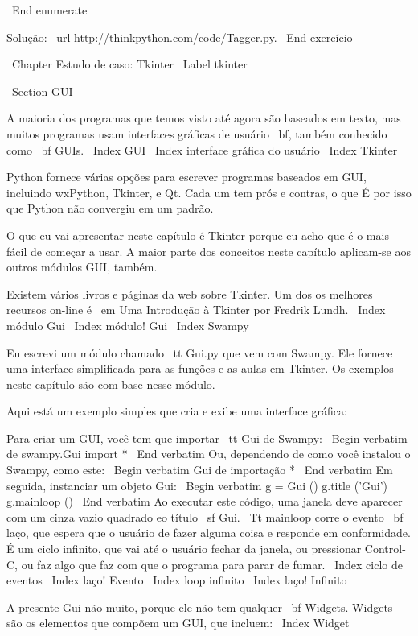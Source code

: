 \documentclass[10pt]{book}
\begin{document}
{{{{{{{{{{{{{{{{{{{\ End {enumerate}

Solução: \ url {http://thinkpython.com/code/Tagger.py}.
\ End {} exercício



\ Chapter {Estudo de caso: Tkinter}
\ Label {} tkinter

\ Section {GUI}

A maioria dos programas que temos visto até agora são baseados em texto, mas
muitos programas usam {interfaces gráficas de usuário \ bf}, também
conhecido como {\ bf GUIs}.
\ Index {GUI}
\ Index {interface gráfica do usuário}
\ Index {} Tkinter

Python fornece várias opções para escrever programas baseados em GUI,
incluindo wxPython, Tkinter, e Qt. Cada um tem prós e contras, o que
É por isso que Python não convergiu em um padrão.

O que eu vai apresentar neste capítulo é Tkinter porque eu acho que
é o mais fácil de começar a usar. A maior parte dos conceitos
neste capítulo aplicam-se aos outros módulos GUI, também.

Existem vários livros e páginas da web sobre Tkinter. Um dos
os melhores recursos on-line é {\ em Uma Introdução à Tkinter}
por Fredrik Lundh.
\ Index {módulo Gui}
\ Index {módulo! Gui}
\ Index {} Swampy

Eu escrevi um módulo chamado {\ tt Gui.py} que vem com
Swampy. Ele fornece uma interface simplificada para as funções
e as aulas em Tkinter. Os exemplos neste capítulo são
com base nesse módulo.

Aqui está um exemplo simples que cria e exibe uma interface gráfica:

Para criar um GUI, você tem que importar {\ tt Gui} de Swampy:
%
\ Begin {verbatim}
de swampy.Gui import *
\ End {verbatim}
%
Ou, dependendo de como você instalou o Swampy, como este:
%
\ Begin {verbatim}
Gui de importação *
\ End {verbatim}
%
Em seguida, instanciar um objeto Gui:
%
\ Begin {verbatim}
g = Gui ()
g.title ('Gui')
g.mainloop ()
\ End {verbatim}
%
Ao executar este código, uma janela deve aparecer com um cinza vazio
quadrado eo título {\ sf Gui}. {\ Tt mainloop} corre o evento {\ bf
  laço}, que espera que o usuário de fazer alguma coisa e responde
em conformidade. É um ciclo infinito, que vai até o usuário fechar
da janela, ou pressionar Control-C, ou faz algo que faz com que o
programa para parar de fumar.
\ Index {ciclo de eventos}
\ Index {laço! Evento}
\ Index {loop infinito}
\ Index {laço! Infinito}

A presente Gui não muito, porque ele não tem qualquer
{\ bf Widgets}. Widgets são os elementos que compõem um
GUI, que incluem:
\ Index {} Widget

}}}}}}}}}}}}}}}}}}}
\end{document}
